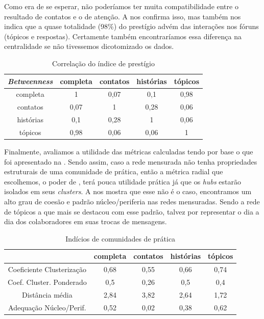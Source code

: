 Como era de se esperar, não poderíamos ter muita compatibilidade entre o
resultado de contatos e o de atenção. A  nos confirma
isso, mas também nos indica que a quase totalidade (98\%) do prestígio advém
das interações nos fóruns (tópicos e respostas). Certamente também
encontraríamos essa diferença na centralidade se não tivessemos dicotomizado os
dados.

\begin{table}[htbp]
	\large       %
	\setlength{\arrayrulewidth}{2\arrayrulewidth}  %
	\setlength{\belowcaptionskip}{10pt}  %
	\caption{Correlação do índice de prestígio} \centering   
	\begin{tabular}{| c | c c c c|}
	\hline
	\emph{Betweenness} & completa & contatos & histórias & tópicos \\ \hline
	completa & 1 & 0,07 & 0,1 & 0,98 \\
	contatos & 0,07 & 1 & 0,28 & 0,06 \\
	histórias & 0,1 & 0,28 & 1 & 0,06 \\
	tópicos & 0,98 & 0,06 & 0,06 & 1 \\\hline
	\end{tabular}
	\label{ap:tab:prest-corr}
\end{table}

Finalmente, avaliamos a utilidade das métricas calculadas tendo por base o que
foi apresentado na . Sendo assim, caso a rede mensurada
não tenha propriedades estruturais de uma comunidade de prática, então a métrica
radial que escolhemos, o poder de \citeauthor{Bonacich1987}, terá pouca
utilidade prática já que os \emph{hubs} estarão isolados em seus
\emph{clusters}. A  nos mostra que esse não é o caso,
encontramos um alto grau de coesão e padrão núcleo/periferia nas redes
mensuradas. Sendo a rede de tópicos a que mais se destacou com esse padrão,
talvez por representar o dia a dia dos colaboradores em suas trocas de
mensagens.

\begin{table}[htbp]
	\large       %
	\setlength{\arrayrulewidth}{2\arrayrulewidth}  %
	\setlength{\belowcaptionskip}{10pt}  %
	\caption{Indícios de comunidades de prática} \centering   
	\begin{tabular}{| c | c | c | c | c |}
	\hline
	 & completa & contatos & histórias & tópicos \\ \hline
	Coeficiente Clusterização & 0,68 & 0,55 & 0,66 & 0,74 \\
	Coef. Cluster. Ponderado & 0,5 & 0,26 & 0,5 & 0,4 \\
	Distância média & 2,84 & 3,82 & 2,64 & 1,72 \\
	Adequação Núcleo/Perif. & 0,52 & 0,02 & 0,38 & 0,62 \\\hline
	\end{tabular}
	\label{ap:tab:comu_prat}
\end{table}


